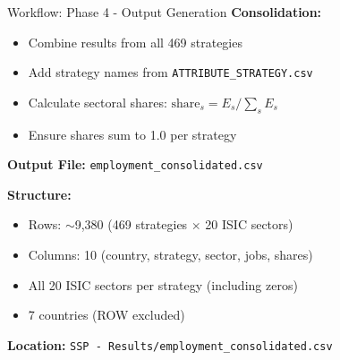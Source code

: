 \documentclass[10pt]{beamer}
\begin{document}
\begin{frame}{Workflow: Phase 4 - Output Generation}
\textbf{Consolidation:}

\vspace{0.3cm}

\begin{itemize}
    \item Combine results from all 469 strategies
    \item Add strategy names from \texttt{ATTRIBUTE\_STRATEGY.csv}
    \item Calculate sectoral shares: $\text{share}_s = E_s / \sum_s E_s$
    \item Ensure shares sum to 1.0 per strategy
\end{itemize}

\vspace{0.5cm}

\textbf{Output File:} \texttt{employment\_consolidated.csv}

\vspace{0.3cm}

\textbf{Structure:}
\begin{itemize}
    \item Rows: $\sim$9,380 (469 strategies $\times$ 20 ISIC sectors)
    \item Columns: 10 (country, strategy, sector, jobs, shares)
    \item All 20 ISIC sectors per strategy (including zeros)
    \item 7 countries (ROW excluded)
\end{itemize}

\vspace{0.5cm}

\textbf{Location:} \texttt{SSP - Results/employment\_consolidated.csv}
\end{frame}

\end{document}
